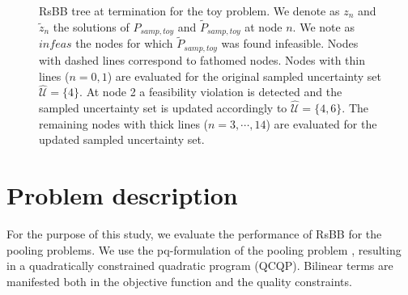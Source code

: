 \documentclass[sn-mathphys-num]{sn-jnl}
\begin{document}
\begin{figure}
{
}
    \caption{RsBB tree at termination for the toy problem. We denote as $z_n$ and $\tilde{z}_n$ the solutions of $P_{samp,toy}$ and $\tilde{P}_{samp,toy}$ at node $n$. We note as $infeas$ the nodes for which $\tilde{P}_{samp,toy}$ was found infeasible. Nodes with dashed lines correspond to fathomed nodes. Nodes with thin lines ($n=0,1$) are evaluated for the original sampled uncertainty set $\hat{\mathcal{U}}=\{4\}$. At node 2 a feasibility violation is detected and the sampled uncertainty set is updated accordingly to $\hat{\mathcal{U}}=\{4,6\}$. The remaining nodes with thick lines ($n=3,\cdots,14$) are evaluated for the updated sampled uncertainty set.}
    \label{fig:toy_tree}
\end{figure}




\section{Problem description}\label{prob}
For the purpose of this study, we evaluate the performance of RsBB for the pooling problems. We use the pq-formulation of the pooling problem \citep{Sahinidis2005}, resulting in a quadratically constrained quadratic program (QCQP). Bilinear terms are manifested both in the objective function and the quality constraints.
\end{document}

